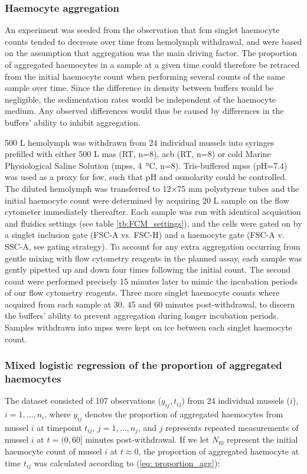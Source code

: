 \subsubsection{Haemocyte aggregation}
An experiment was seeded from the observation that \acrshort{fcm} singlet haemocyte counts tended to decrease over time from hemolymph withdrawal, and were based on the assumption that aggregation was the main driving factor. The proportion of aggregated haemocytes in a sample at a given time could therefore be retraced from the initial haemocyte count when performing several counts of the same sample over time. Since the difference in density between buffers would be negligible, the sedimentation rates would be independent of the haemocyte medium. Any observed differences would thus be caused by differences in the buffers' ability to inhibit aggregation.

500 \micro L hemolymph was withdrawn from 24 individual mussels into syringes prefilled with either 500 \micro L \acrshort{mas} (RT, n=8), \acrshort{acb} (RT, n=8) or cold Marine Physiological Saline Solution (\acrshort{mpss}, \SI{4}{\celsius}, n=8). Tris-buffered \acrshort{mpss} (pH=7.4) was used as a proxy for \acrshort{fsw}, such that pH and osmolarity could be controlled. The diluted hemolymph was transferred to 12$\times$75 mm polystyrene tubes and the initial haemocyte count were determined by acquiring 20 \micro L sample on the flow cytometer immediately thereafter. Each sample was run with identical acquisition and fluidics settings (see table \ref{tb:FCM_settings}), and the cells were gated on by a singlet inclusion gate (FSC-A vs. FSC-H) and a haemocyte gate (FSC-A v. SSC-A, see gating strategy). To account for any extra aggregation occurring from gentle mixing with flow cytometry reagents in the planned assay, each sample was gently pipetted up and down four times following the initial count. The second count were performed precisely 15 minutes later to mimic the incubation periods of our flow cytometry reagents. Three more singlet haemocyte counts where acquired from each sample at 30, 45 and 60 minutes post-withdrawal, to discern the buffers' ability to prevent aggregation during longer incubation periods. Samples withdrawn into \acrshort{mpss} were kept on ice between each singlet haemocyte count.

\subsubsection{Mixed logistic regression of the proportion of aggregated haemocytes}
The dataset consisted of 107 observations ($y_{ij}, t_{ij}$) from 24 individual mussels ($i$), $i = 1,...,n_{i}$, where $y_{ij}$ denotes the proportion of aggregated haemocytes from mussel $i$ at timepoint $t_{ij}$, $j = 1,...,n_{j}$, and $j$ represents repeated measurements of mussel $i$ at $t = (0, 60]$ minutes post-withdrawal. If we let $N_{t0}$ represent the initial haemocyte count of mussel $i$ at $t \approx 0$, the proportion of aggregated haemocyte at time $t_{ij}$ was calculated according to (\ref{eq: proportion_agg}):

